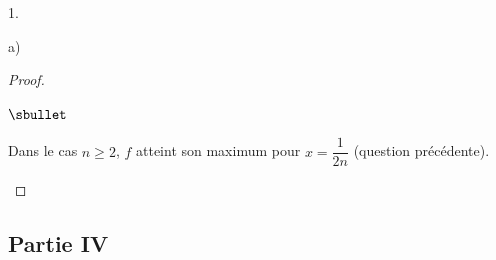 \documentclass[11pt]{article}%
\begin{document}
\begin{noliste}{1.}
\begin{noliste}{a)}
\begin{proof}
\begin{noliste}{$\sbullet$}
      \item Dans le cas $n \geq 2$, $f$ atteint son maximum pour $x =
        \dfrac{1}{2n}$ (\cf question précédente). %
        ~\\[-1.2cm]
      \end{noliste}
    \end{proof}
  \end{noliste}
\end{noliste}


\newpage


\subsection*{Partie IV}
\end{document}

